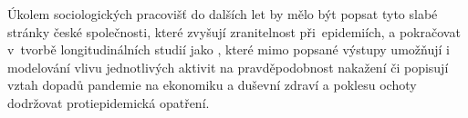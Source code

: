 Úkolem sociologických pracovišť do dalších let by mělo být popsat tyto slabé stránky české společnosti, které zvyšují zranitelnost při epidemiích, a pokračovat v tvorbě longitudinálních studií jako , které mimo popsané výstupy umožňují i modelování vlivu jednotlivých aktivit na pravděpodobnost na\-ka\-že\-ní či popisují vztah dopadů pandemie na ekonomiku a duševní zdraví a poklesu ochoty dodržovat protiepidemická opatření.